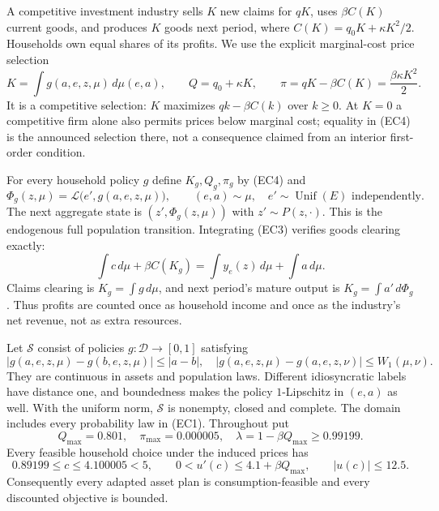 \documentclass[11pt,a4paper]{article}
\begin{document}
A competitive investment industry sells $K$ new claims for $qK$, uses
$\beta C(K)$ current goods, and produces $K$ goods next period, where
$C(K)=q_0K+\kappa K^2/2$. Households own equal shares of its profits.
We use the explicit marginal-cost price selection
\[
 K=\int g(a,e,z,\mu)\,d\mu(e,a),\qquad
 Q=q_0+\kappa K,\qquad
 \pi=qK-\beta C(K)=\frac{\beta\kappa K^2}{2}.
 \tag{EC4}
\]
It is a competitive selection: $K$ maximizes
$qk-\beta C(k)$ over $k\geq0$. At $K=0$ a competitive firm alone also
permits prices below marginal cost; equality in \textup{(EC4)} is the
announced selection there, not a consequence claimed from an interior
first-order condition.

For every household policy $g$ define $K_g,Q_g,\pi_g$ by
\textup{(EC4)} and
\[
 \Phi_g(z,\mu)=\mathcal L\bigl(e',g(a,e,z,\mu)\bigr),
 \qquad (e,a)\sim\mu,\quad e'\sim\operatorname{Unif}(E)
 \text{ independently}.
 \tag{EC5}
\]
The next aggregate state is $(z',\Phi_g(z,\mu))$ with $z'\sim P(z,\cdot)$.
This is the endogenous full population transition. Integrating
\textup{(EC3)} verifies goods clearing exactly:
\[
 \int c\,d\mu+\beta C(K_g)=\int y_e(z)\,d\mu+\int a\,d\mu.
 \tag{EC6}
\]
Claims clearing is $K_g=\int g\,d\mu$, and next period's mature output
is $K_g=\int a'\,d\Phi_g$. Thus profits are counted once as household
income and once as the industry's net revenue, not as extra resources.

Let $\mathcal S$ consist of policies $g:\mathcal D\to[0,1]$ satisfying
\[
 |g(a,e,z,\mu)-g(b,e,z,\mu)|\leq|a-b|,
 \quad |g(a,e,z,\mu)-g(a,e,z,\nu)|\leq W_1(\mu,\nu).
 \tag{EC7}
\]
They are continuous in assets and population laws. Different idiosyncratic
labels have distance one, and boundedness makes the policy $1$-Lipschitz
in $(e,a)$ as well. With the uniform norm, $\mathcal S$ is nonempty,
closed and complete. The domain includes every probability law in
\textup{(EC1)}. Throughout put
\[
 Q_{\max}=0.801,\quad \pi_{\max}=0.000005,
 \quad \lambda=1-\beta Q_{\max}\geq0.99199.
 \tag{EC8}
\]
Every feasible household choice under the induced prices has
\[
 0.89199\leq c\leq4.100005<5,
 \qquad 0<u'(c)\leq4.1+\beta Q_{\max},\qquad |u(c)|\leq12.5.
 \tag{EC9}
\]
Consequently every adapted asset plan is consumption-feasible and every
discounted objective is bounded.
\end{document}
